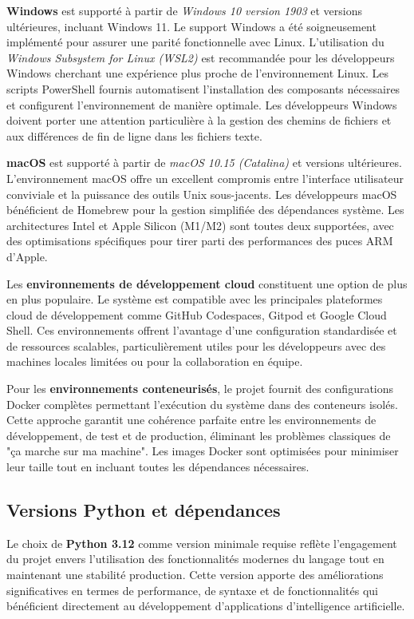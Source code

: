 \textbf{Windows} est supporté à partir de \emph{Windows 10 version 1903} et versions ultérieures, incluant Windows 11. Le support Windows a été soigneusement implémenté pour assurer une parité fonctionnelle avec Linux. L'utilisation du \emph{Windows Subsystem for Linux (WSL2)} est recommandée pour les développeurs Windows cherchant une expérience plus proche de l'environnement Linux. Les scripts PowerShell fournis automatisent l'installation des composants nécessaires et configurent l'environnement de manière optimale. Les développeurs Windows doivent porter une attention particulière à la gestion des chemins de fichiers et aux différences de fin de ligne dans les fichiers texte.

\textbf{macOS} est supporté à partir de \emph{macOS 10.15 (Catalina)} et versions ultérieures. L'environnement macOS offre un excellent compromis entre l'interface utilisateur conviviale et la puissance des outils Unix sous-jacents. Les développeurs macOS bénéficient de Homebrew pour la gestion simplifiée des dépendances système. Les architectures Intel et Apple Silicon (M1/M2) sont toutes deux supportées, avec des optimisations spécifiques pour tirer parti des performances des puces ARM d'Apple.

Les \textbf{environnements de développement cloud} constituent une option de plus en plus populaire. Le système est compatible avec les principales plateformes cloud de développement comme GitHub Codespaces, Gitpod et Google Cloud Shell. Ces environnements offrent l'avantage d'une configuration standardisée et de ressources scalables, particulièrement utiles pour les développeurs avec des machines locales limitées ou pour la collaboration en équipe.

Pour les \textbf{environnements conteneurisés}, le projet fournit des configurations Docker complètes permettant l'exécution du système dans des conteneurs isolés. Cette approche garantit une cohérence parfaite entre les environnements de développement, de test et de production, éliminant les problèmes classiques de "ça marche sur ma machine". Les images Docker sont optimisées pour minimiser leur taille tout en incluant toutes les dépendances nécessaires.

\subsection{Versions Python et dépendances}

Le choix de \textbf{Python 3.12} comme version minimale requise reflète l'engagement du projet envers l'utilisation des fonctionnalités modernes du langage tout en maintenant une stabilité production. Cette version apporte des améliorations significatives en termes de performance, de syntaxe et de fonctionnalités qui bénéficient directement au développement d'applications d'intelligence artificielle.

